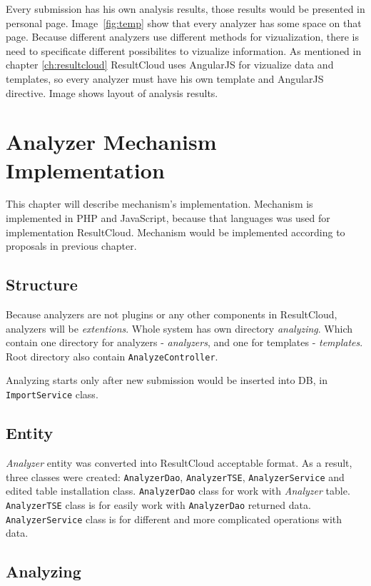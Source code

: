 Every submission has his own analysis results, those results would be presented in personal page. Image\ \ref{fig:temp} show that every analyzer has some space on that page. Because different analyzers use different methods for vizualization, there is need to specificate different possibilites to vizualize information. As mentioned in chapter \ref{ch:resultcloud} ResultCloud uses AngularJS for vizualize data and templates, so every analyzer must have his own template and AngularJS  directive. Image shows layout of analysis results.

\chapter{Analyzer Mechanism Implementation}
\label{ch:analyzer_implement}

This chapter will describe mechanism's implementation. Mechanism is implemented in PHP and JavaScript, because that languages was used for implementation ResultCloud. Mechanism would be implemented according to proposals in previous chapter.

\section{Structure}

Because analyzers are not plugins or any other components in ResultCloud, analyzers will be \emph{extentions}. Whole system has own directory \emph{analyzing}. Which contain one directory for analyzers - \emph{analyzers}, and one for templates - \emph{templates}. Root directory also contain \texttt{AnalyzeController}.

Analyzing starts only after new submission would be inserted into DB, in \texttt{ImportService} class.

\section{Entity}

\emph{Analyzer} entity was converted into ResultCloud acceptable format. As a result, three classes were created: \texttt{AnalyzerDao}, \texttt{AnalyzerTSE}, \texttt{AnalyzerService} and edited table installation class. \texttt{AnalyzerDao} class for work with \emph{Analyzer} table. \texttt{AnalyzerTSE} class is for easily work with \texttt{AnalyzerDao} returned data. \texttt{AnalyzerService} class is for different and more complicated operations with data.

\section{Analyzing}

